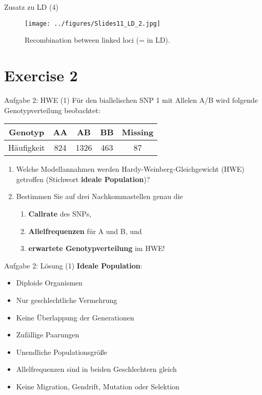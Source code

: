 \documentclass{beamer}
\begin{document}
\begin{frame}{Zusatz zu LD (4)}
\begin{figure}[h]
\begin{center}
\texttt{[image: ../figures/Slides11\_LD\_2.jpg]}
\caption{Recombination between linked loci (= in LD).}
\label{fig:LD2}
\end{center}
\end{figure}
\end{frame}

\section{Exercise 2}

\begin{frame}{Aufgabe 2: HWE (1)}
Für den biallelischen SNP 1 mit Allelen A/B wird folgende Genotypverteilung beobachtet:

\begin{table}[here]
\begin{center}
\begin{tabular}[h]{ccccc}
Genotyp & AA & AB & BB & Missing \\
\hline
Häufigkeit & 824 & 1326 & 463 & 87\\
\end{tabular}
\end{center}
\end{table}

\begin{enumerate}
    \item Welche Modellannahmen werden Hardy-Weinberg-Gleichgewicht (HWE) getroffen (Stichwort \textbf{ideale Population})?
    \item Bestimmen Sie auf drei Nachkommastellen genau die 
    \begin{enumerate}
        \item \textbf{Callrate} des SNPs,
        \item \textbf{Allelfrequenzen} für A und B, und 
        \item \textbf{erwartete Genotypverteilung} im HWE!
    \end{enumerate}
\end{enumerate}
\end{frame}

\begin{frame}{Aufgabe 2: Lösung (1)}
\textbf{Ideale Population}:

\begin{itemize}
    \item Diploide Organismen
    \item Nur geschlechtliche Vermehrung
    \item Keine Überlappung der Generationen
    \item Zufällige Paarungen
    \item Unendliche Populationsgröße
    \item Allelfrequenzen sind in beiden Geschlechtern gleich
    \item Keine Migration, Gendrift, Mutation oder Selektion
\end{itemize}
\end{frame}
\end{document}
